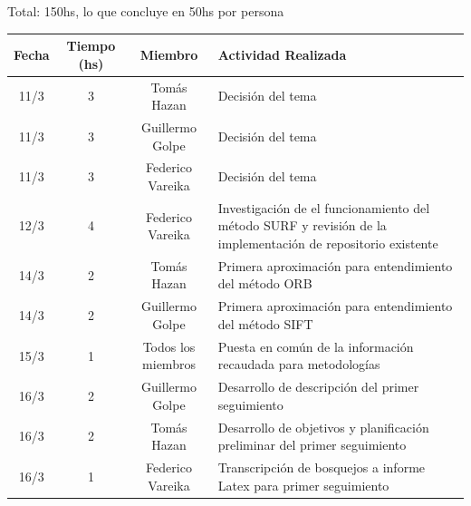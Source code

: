 \documentclass[12pt, a4paper]{article}
\begin{document}
Total: 150hs, lo que concluye en 50hs por persona

\newpage

\begin{center}
\renewcommand{\arraystretch}{1.5}
{
    \begin{tabular}{| c | c | c | m{6cm} |} 
    \hline 
    
    \textbf{Fecha} & 
    \textbf{Tiempo (hs)} & 
    \textbf{Miembro} &
    \textbf{Actividad Realizada}\\

    \hline 

    11/3 &
    3 &
    Tomás Hazan &
    Decisión del tema \\

    11/3&
    3&
    Guillermo Golpe&
    Decisión del tema \\

    11/3&
    3&
    Federico Vareika&
    Decisión del tema \\

    12/3&
    4&
    Federico Vareika&
    Investigación de el funcionamiento del método SURF y revisión de la implementación de repositorio existente \\

    14/3&
    2&
    Tomás Hazan&
    Primera aproximación para entendimiento del método ORB \\

    14/3&
    2&
    Guillermo Golpe&
    Primera aproximación para entendimiento del método SIFT  \\

    15/3&
    1&
    Todos los miembros&
    Puesta en común de la información recaudada para metodologías \\

    16/3&
    2&
    Guillermo Golpe&
    Desarrollo de descripción del primer seguimiento \\

    16/3&
    2&
    Tomás Hazan&
    Desarrollo de objetivos y planificación preliminar del primer seguimiento \\

    16/3&
    1&
    Federico Vareika&
    Transcripción de bosquejos a informe Latex para primer seguimiento \\

    \hline 
\end{tabular}}
\end{center}

\newpage 



 

\end{document}
